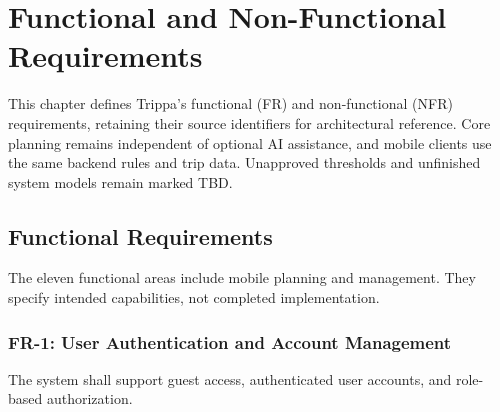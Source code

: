 \chapter{Functional and Non-Functional Requirements}
\label{ch:requirements}

This chapter defines Trippa's functional (FR) and non-functional (NFR) requirements, retaining their source identifiers for architectural reference. Core planning remains independent of optional AI assistance, and mobile clients use the same backend rules and trip data. Unapproved thresholds and unfinished system models remain marked TBD.

\section{Functional Requirements}
The eleven functional areas include mobile planning and management. They specify intended capabilities, not completed implementation.

\subsection{FR-1: User Authentication and Account Management}

The system shall support guest access, authenticated user accounts, and role-based authorization.


